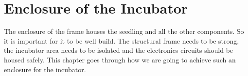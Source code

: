 \documentclass[../main]{subfiles}
\begin{document}
\chapter{Enclosure of the Incubator} \label{chp:}

The enclosure of the frame houses the seedling and all the other components. So it
is important for it to be well build. The structural frame needs to be strong,
the incubator area needs to be isolated and the electronics circuits should be
housed safely. This chapter goes through how we are going to achieve such an enclosure
for the incubator.










\end{document}
